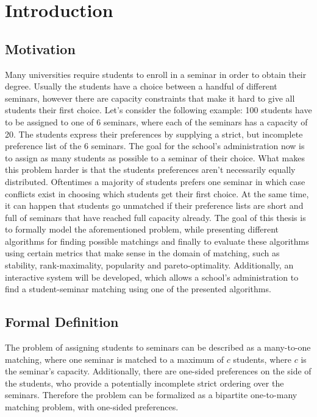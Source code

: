 \section{Introduction}
\label{sec:introduction}

\subsection{Motivation}
Many universities require students to enroll in a seminar in order to obtain their degree. Usually the students have a choice between a handful of different seminars, however there are capacity constraints that make it hard to give all students their first choice. Let's consider the following example: 100 students have to be assigned to one of 6 seminars, where each of the seminars has a capacity of 20. The students express their preferences by supplying a strict, but incomplete preference list of the 6 seminars. The goal for the school's administration now is to assign as many students as possible to a seminar of their choice. 
\newline
What makes this problem harder is that the students preferences aren't necessarily equally distributed. Oftentimes a majority of students prefers one seminar in which case conflicts exist in choosing which students get their first choice. At the same time, it can happen that students go unmatched if their preference lists are short and full of seminars that have reached full capacity already.
\newline
The goal of this thesis is to formally model the aforementioned problem, while presenting different algorithms for finding possible matchings and finally to evaluate these algorithms using certain metrics that make sense in the domain of matching, such as stability, rank-maximality, popularity and pareto-optimality. Additionally, an interactive system will be developed, which allows a school's administration to find a student-seminar matching using one of the presented algorithms. 

\subsection{Formal Definition}
The problem of assigning students to seminars can be described as a many-to-one matching, where one seminar is matched to a maximum of $c$ students, where $c$ is the seminar's capacity. Additionally, there are one-sided preferences on the side of the students, who provide a potentially incomplete strict ordering over the seminars. Therefore the problem can be formalized as a bipartite one-to-many matching problem, with one-sided preferences.

